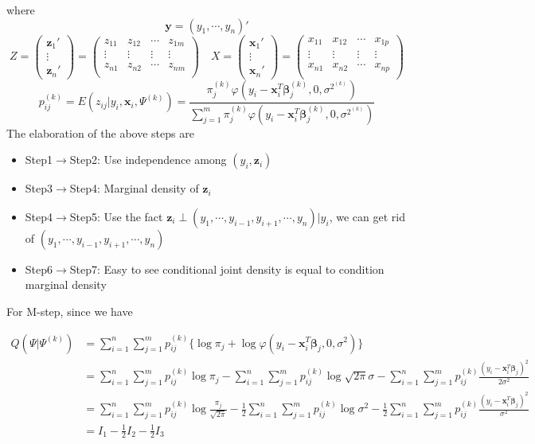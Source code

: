 \documentclass[]{book}
\theoremstyle{definition}
\theoremstyle{definition}
\theoremstyle{definition}
\theoremstyle{remark}
\begin{document}
where \[\mathbf{y}=(y_{1},\cdots,y_{n})'\] \[Z=
\begin{pmatrix}
\mathbf{z}_{1}'\\
\vdots\\
\mathbf{z}_{n}'
\end{pmatrix}=
\begin{pmatrix}
z_{11} & z_{12} & \cdots & z_{1m}\\
\vdots & \vdots & \vdots & \vdots\\
z_{n1} & z_{n2} & \cdots & z_{nm}\\
\end{pmatrix}
\quad
X=
\begin{pmatrix}
\mathbf{x}_{1}'\\
\vdots\\
\mathbf{x}_{n}'
\end{pmatrix}=
\begin{pmatrix}
x_{11} & x_{12} & \cdots & x_{1p}\\
\vdots & \vdots & \vdots & \vdots\\
x_{n1} & x_{n2} & \cdots & x_{np}\\
\end{pmatrix}\]
\[p^{(k)}_{ij}=E(z_{ij}|y_{i}, \mathbf{x}_{i}, \Psi^{(k)})=\frac{\pi^{(k)}_{j}\varphi(y_{i}-\mathbf{x}^{T}_{i}\boldsymbol{\beta}^{(k)}_{j}, 0, \sigma^{2^{(k)}})}{\sum^{m}_{j=1}\pi^{(k)}_{j}\varphi(y_{i}-\mathbf{x}^{T}_{i}\boldsymbol{\beta}^{(k)}_{j}, 0, \sigma^{2^{(k)}})}\]
The elaboration of the above steps are

\begin{itemize}
\item Step1$\rightarrow$Step2: Use independence among $(y_{i}, \mathbf{z}_{i})$
\item Step3$\rightarrow$Step4: Marginal density of $\mathbf{z}_{i}$
\item Step4$\rightarrow$Step5: Use the fact $\mathbf{z}_{i}\perp(y_{1},\cdots,y_{i-1},y_{i+1},\cdots,y_{n})|y_{i}$, we can get rid of $(y_{1},\cdots,y_{i-1},y_{i+1},\cdots,y_{n})$
\item Step6$\rightarrow$Step7: Easy to see conditional joint density is equal to condition marginal density
\end{itemize}

For M-step, since we have

\begin{align*}
Q(\Psi|\Psi^{(k)}) & =\sum^{n}_{i=1}\sum^{m}_{j=1}p^{(k)}_{ij}\{\log\pi_{j}+\log\varphi(y_{i}-\mathbf{x}^{T}_{i}\boldsymbol{\beta}_{j}, 0, \sigma^{2})\}\\
                   & =\sum^{n}_{i=1}\sum^{m}_{j=1}p^{(k)}_{ij}\log\pi_{j}-\sum^{n}_{i=1}\sum^{m}_{j=1}p^{(k)}_{ij}\log\sqrt{2\pi}\sigma-\sum^{n}_{i=1}\sum^{m}_{j=1}p^{(k)}_{ij}\frac{(y_{i}-\mathbf{x}_{i}^{T}\boldsymbol{\beta}_{j})^{2}}{2\sigma^{2}}\\
                   & =\sum^{n}_{i=1}\sum^{m}_{j=1}p^{(k)}_{ij}\log\frac{\pi_{j}}{\sqrt{2\pi}}-\frac{1}{2}\sum^{n}_{i=1}\sum^{m}_{j=1}p^{(k)}_{ij}\log\sigma^{2}-\frac{1}{2}\sum^{n}_{i=1}\sum^{m}_{j=1}p^{(k)}_{ij}\frac{(y_{i}-\mathbf{x}_{i}^{T}\boldsymbol{\beta}_{j})^{2}}{\sigma^{2}}\\
                   & =I_{1}-\frac{1}{2}I_{2}-\frac{1}{2}I_{3}
\end{align*}
\end{document}
